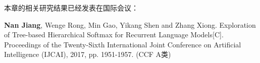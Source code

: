 本章的相关研究结果已经发表在国际会议：

\textbf{Nan Jiang}, Wenge Rong, Min Gao, Yikang Shen and Zhang Xiong. Exploration of Tree-based Hierarchical Softmax for Recurrent Language Models[C]. Proceedings of the Twenty-Sixth International Joint Conference on Artificial Intelligence (IJCAI), 2017, pp. 1951-1957. (CCF A类)
